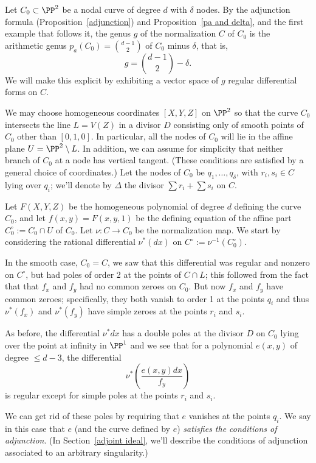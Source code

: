 Let $C_{0} \subset \PP^2$  be a nodal curve of degree $d$ with $\delta$ nodes. By the adjunction
formula (Proposition~\ref{adjunction}) and Proposition~\ref{pa and delta}, and the first example that follows it, 
the genus $g$ of the normalization $C$ of $C_{0}$ is
the arithmetic genus $p_{a}(C_{0}) = \binom{d-1}{2}$ of $C_{0}$ minus $\delta$, that is,
$$
g = \binom{d-1}{2} -\delta.
$$
We will make this explicit by exhibiting a vector space of $g$ regular differential forms on $C$.

We may choose homogeneous coordinates  $[X,Y,Z]$ on $\PP^2$ so that the curve $C_0$ intersects the line $L = V(Z)$ in a divisor $D$ consisting only of smooth points of $C_{0}$  other than $[0,1,0]$. In particular,  all the nodes of $C_0$ will lie in the affine plane $U = \PP^2 \setminus L$.
In addition, we can assume for simplicity that  neither branch of $C_0$ at a node has vertical tangent. (These conditions are satisfied by a general choice of coordinates.) Let the nodes of $C_0$ be $q_1,\dots,q_\delta$, with $r_i, s_i \in C$ lying over $q_i$; we'll denote by $\Delta$ the divisor $\sum r_i + \sum s_i$ on $C$.

Let $F(X,Y,Z)$ be the homogeneous polynomial of degree $d$ defining the curve $C_0$, and let $f(x,y) = F(x,y,1)$ be the defining equation of the affine part $C_{0}^{\circ}:= C_0 \cap U$ of $C_0$. Let $\nu: C\to C_0$ be the normalization map. We start by considering the rational differential 
$\nu^*(dx)$ on 
$C^{\circ}:= \nu^{-1}(C_{0}^{\circ})$. 

In the smooth case, $C_{0}=C$, we saw that this differential was regular and nonzero on $C^{\circ}$, but had poles of order 2 at the points of $C \cap L$; this followed from the fact that 
that $f_{x}$ and $f_{y}$ had no common zeroes on $C_0$. But now $f_{x}$ and $f_{y}$ have common zeroes; specifically, they both vanish to order 1 at the points $q_{i}$ and thus $\nu^*(f_{x})$ and $\nu^*(f_{y})$ have simple zeroes at the points $r_i$ and $s_i$. 

As before, the differential $\nu^*dx$ has a double poles at the divisor $D$ on $C_{0}$ lying over the point at infinity in $\PP^{1}$
and we see that for a polynomial $e(x,y)$ of degree $\leq d-3$, the differential
$$
\nu^*( \frac{e(x,y)dx}{f_{y}})
$$
is regular except for simple poles at the points $r_i$ and $s_i$.

We can get rid of these poles by requiring that $e$ vanishes at the points $q_i$. We say in this case that $e$ (and the curve defined by $e$) \emph{satisfies the conditions of adjunction}. (In Section~\ref{adjoint ideal}, we'll describe the  conditions of adjunction associated to an arbitrary singularity.) 

